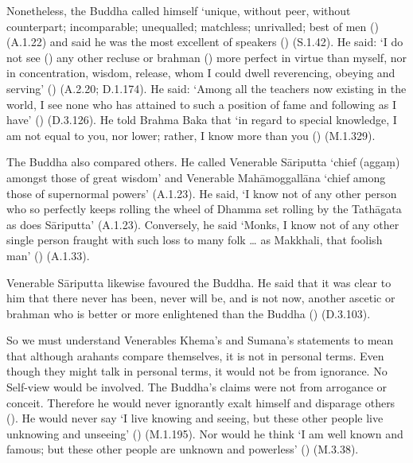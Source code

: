 Nonetheless, the Buddha called himself `unique, without peer, without counterpart; incomparable; unequalled; matchless; unrivalled; best of men () (A.1.22) and said he was the most excellent of speakers () (S.1.42). He said: `I do not see () any other recluse or brahman () more perfect in virtue than myself, nor in concentration, wisdom, release, whom I could dwell reverencing, obeying and serving' () (A.2.20; D.1.174). He said: `Among all the teachers now existing in the world, I see none who has attained to such a position of fame and following as I have' () (D.3.126). He told Brahma Baka that `in regard to special knowledge, I am not equal to you, nor lower; rather, I know more than you () (M.1.329).

The Buddha also compared others. He called Venerable Sāriputta `chief (aggaṃ) amongst those of great wisdom' and Venerable Mahāmoggallāna `chief among those of supernormal powers' (A.1.23). He said, `I know not of any other person who so perfectly keeps rolling the wheel of Dhamma set rolling by the Tathāgata as does Sāriputta' (A.1.23). Conversely, he said `Monks, I know not of any other single person fraught with such loss to many folk \ldots{} as Makkhali, that foolish man' () (A.1.33).

Venerable Sāriputta likewise favoured the Buddha. He said that it was clear to him that there never has been, never will be, and is not now, another ascetic or brahman who is better or more enlightened than the Buddha () (D.3.103).

So we must understand Venerables Khema's and Sumana's statements to mean that although arahants compare themselves, it is not in personal terms. Even though they might talk in personal terms, it would not be from ignorance. No Self-view would be involved. The Buddha's claims were not from arrogance or conceit. Therefore he would never ignorantly exalt himself and disparage others (). He would never say `I live knowing and seeing, but these other people live unknowing and unseeing' () (M.1.195). Nor would he think `I am well known and famous; but these other people are unknown and powerless' () (M.3.38).
